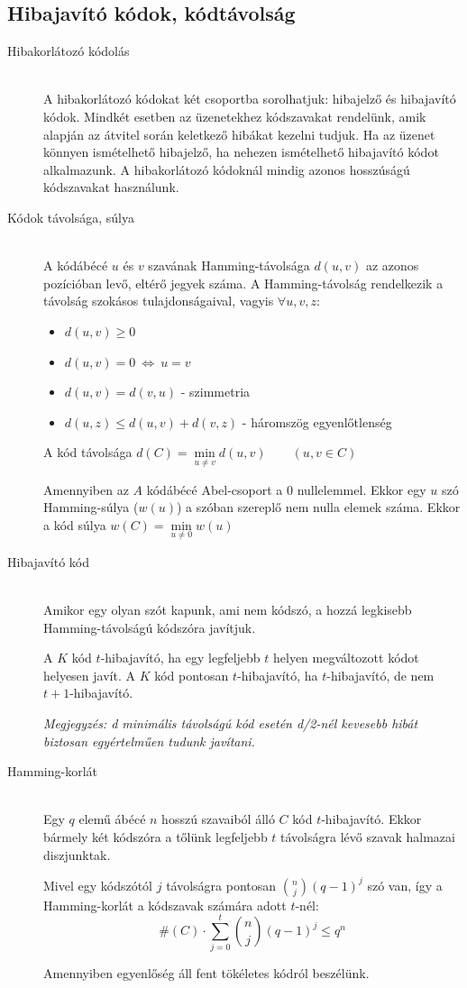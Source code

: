 \documentclass[margin=0px]{article}
\begin{document}
\subsection{Hibajavító kódok, kódtávolság}
\begin{description}
    \item[Hibakorlátozó kódolás] \hfill \\
        A hibakorlátozó kódokat két csoportba sorolhatjuk: hibajelző és  hibajavító kódok. Mindkét esetben az üzenetekhez kódszavakat rendelünk, amik alapján az átvitel során keletkező hibákat kezelni tudjuk. Ha az üzenet könnyen ismételhető hibajelző, ha nehezen ismételhető hibajavító kódot alkalmazunk. A hibakorlátozó kódoknál mindig azonos hosszúságú kódszavakat használunk.
    \item[Kódok távolsága, súlya] \hfill \\
        A kódábécé $u$ és $v$ szavának Hamming-távolsága $d(u,v)$ az azonos pozícióban levő, eltérő jegyek száma.  A Hamming-távolság rendelkezik a távolság szokásos tulajdonságaival, vagyis $\forall u,v,z$:
        \begin{itemize}
            \item $d(u,v) \geq 0$
            \item $d(u,v) = 0 \ \Longleftrightarrow \ u = v$
            \item $d(u,v) = d(v,u)$ - szimmetria
            \item $d(u,z) \leq d(u,v)+d(v,z)$ - háromszög egyenlőtlenség
        \end{itemize}
        A kód távolsága $d(C) = \min\limits_{u\neq v}d(u,v) \qquad (u,v \in C)$

        Amennyiben az $A$ kódábécé Abel-csoport a $0$ nullelemmel. Ekkor egy $u$ szó Hamming-súlya ($w(u)$) a szóban szereplő nem nulla elemek száma. Ekkor a kód súlya $w(C)  = \min\limits_{u\neq 0}w(u)$
    \item[Hibajavító kód] \hfill \\
        Amikor egy olyan szót kapunk, ami nem kódszó, a hozzá legkisebb Hamming-távolságú kódszóra javítjuk.

        A $K$ kód $t$-hibajavító, ha egy legfeljebb $t$ helyen megváltozott kódot helyesen javít. A $K$ kód pontosan $t$-hibajavító, ha $t$-hibajavító, de nem $t+1$-hibajavító.

        \textit{Megjegyzés: d minimális távolságú kód esetén d/2-nél kevesebb hibát biztosan egyértelműen tudunk javítani.}
    \item[Hamming-korlát] \hfill \\
        Egy $q$ elemű ábécé $n$ hosszú szavaiból álló $C$ kód $t$-hibajavító. Ekkor bármely két kódszóra a tőlünk legfeljebb $t$ távolságra lévő szavak halmazai diszjunktak.

        Mivel egy kódszótól $j$ távolságra pontosan $\binom{n}{j}(q-1)^j$ szó van, így a Hamming-korlát a kódszavak számára adott $t$-nél:
        \[\#(C) \cdot \sum\limits_{j=0}^{t}\binom{n}{j}(q-1)^j \leq q^n \]

        Amennyiben egyenlőség áll fent tökéletes kódról beszélünk.
\end{description}
\end{document}
